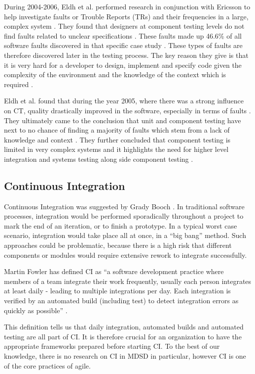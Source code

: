 \documentclass[fina_report_innit.tex]{subfiles}
\begin{document}
During 2004-2006, Eldh et al. performed research in conjunction with Ericsson to help investigate faults or Trouble Reports (TRs) and their frequencies in a large, complex system \cite{eldh2007component}. They found that designers at component testing levels do not find faults related to unclear specifications \cite{eldh2007component}. These faults made up 46.6\% of all software faults discovered in that specific case study \cite{eldh2007component}. These types of faults are therefore discovered later in the testing process. The key reason they give is that it is very hard for a developer to design, implement and specify code given the complexity of the environment and the knowledge of the context which is required \cite{eldh2007component}. 

Eldh et al. found that during the year 2005, where there was a strong influence on CT, quality drastically improved in the software, especially in terms of faults \cite{eldh2007component}. They ultimately came to the conclusion that unit and component testing have next to no chance of finding a majority of faults which stem from a lack of knowledge and context \cite{eldh2007component}. They further concluded that component testing is limited in very complex systems and it highlights the need for higher level integration and systems testing along side component testing \cite{eldh2007component}.

\subsection{Continuous Integration}
Continuous Integration was suggested by Grady Booch \cite{booch2006object}. In traditional software processes, integration would be performed sporadically throughout a project to mark the end of an iteration, or to finish a prototype. In a typical worst case scenario, integration would take place all at once, in a “big bang” method. Such approaches could be problematic, because there is a high risk that different components or modules would require extensive rework to integrate successfully.

Martin Fowler has defined CI as “a software development practice where members of a team  integrate  their  work  frequently,  usually  each person  integrates  at  least  daily  -  leading  to  multiple integrations per day. Each integration is verified by an automated build (including test) to detect integration errors as quickly as possible” \cite{fowler2006continuous}.

This definition tells us that daily integration, automated builds and automated testing are all part of CI. It is therefore crucial for an organization to have the appropriate frameworks prepared before starting CI. To the best of our knowledge, there is no research on CI in MDSD in particular, however CI is one of the core practices of agile.
\end{document}
